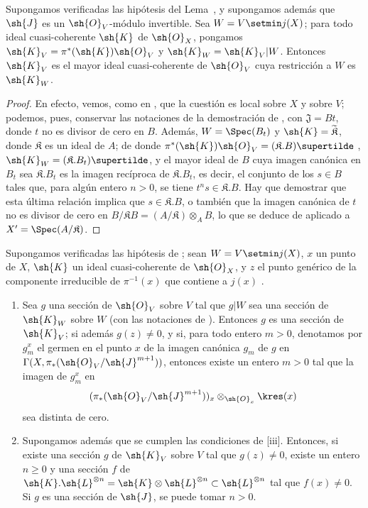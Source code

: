\documentclass[oneside,10pt]{amsart}
\renewcommand{\geq}{\geqslant}
\newcommand{\oldpage}[2][]{\marginnote{\normalfont\footnotesize\textbf{#1}~|~#2}\ignorespaces}
\let\EGAOriginalLabel\label
\renewcommand{\label}[1]{\phantomsection\EGAOriginalLabel{#1}}
\begin{document}
\begin{corollary}[8.10.4]
\label{II.8.10.4}
Supongamos verificadas las hipótesis del Lema~, y supongamos además que $\sh{J}$ es un $\sh{O}_V$-módulo invertible.
Sea $W=V\setmin j(X)$;
para todo ideal cuasi-coherente $\sh{K}$ de $\sh{O}_X$, pongamos $\sh{K}_V=\pi^*(\sh{K})\sh{O}_V$ y $\sh{K}_W=\sh{K}_V|W$.
Entonces $\sh{K}_V$ es el mayor ideal cuasi-coherente de $\sh{O}_V$ cuya restricción a $W$ es $\sh{K}_W$.
\end{corollary}

\begin{proof}
En efecto, vemos, como en , que la cuestión es local sobre $X$ y sobre $V$;
podemos, pues, conservar las notaciones de la demostración de , con $\mathfrak{J}=Bt$, donde $t$ no es divisor de cero en $B$.
Además, $W=\Spec(B_t)$ y $\sh{K}=\widetilde{\mathfrak{K}}$, donde $\mathfrak{K}$ es un ideal de $A$;
de donde $\pi^*(\sh{K})\sh{O}_V=(\mathfrak{K}.B)\supertilde$ , $\sh{K}_W=(\mathfrak{K}.B_t)\supertilde$, y el mayor ideal
\oldpage[II]{187}
de $B$ cuya imagen canónica en $B_t$ sea $\mathfrak{K}.B_t$ es la imagen recíproca de $\mathfrak{K}.B_t$, es decir, el conjunto de los $s\in B$ tales que, para algún entero $n>0$, se tiene $t^ns\in\mathfrak{K}.B$.
Hay que demostrar que esta última relación implica que $s\in\mathfrak{K}.B$, o también que la imagen canónica de $t$ no es divisor de cero en $B/\mathfrak{K}B=(A/\mathfrak{K})\otimes_A B$, lo que se deduce de  aplicado a $X'=\Spec(A/\mathfrak{K})$.
\end{proof}

\begin{corollary}[8.10.5]
\label{II.8.10.5}
Supongamos verificadas las hipótesis de ;
sean $W=V\setmin j(X)$, $x$ un punto de $X$, $\sh{K}$ un ideal cuasi-coherente de $\sh{O}_X$, y $z$ el punto genérico de la componente irreducible de $\pi^{-1}(x)$ que contiene a $j(x)$ .
\begin{enumerate}
    \item[\rm{(i)}] Sea $g$ una sección de $\sh{O}_V$ sobre $V$ tal que $g|W$ sea una sección de $\sh{K}_W$ sobre $W$ (con las notaciones de ).
        Entonces $g$ es una sección de $\sh{K}_V$;
        si además $g(z)\neq0$, y si, para todo entero $m>0$, denotamos por $g_m^x$ el germen en el punto $x$ de la imagen canónica $g_m$ de $g$ en $\Gamma(X,\pi_*(\sh{O}_V/\sh{J}^{m+1}))$, entonces existe un entero $m>0$ tal que la imagen de $g_m^x$ en
        \[
            (\pi_*(\sh{O}_V/\sh{J}^{m+1}))_x \otimes_{\sh{O}_x} \kres(x)
        \]
        sea distinta de cero.
    \item[\rm{(ii)}] Supongamos además que se cumplen las condiciones de [iii].
        Entonces, si existe una sección $g$ de $\sh{K}_V$ sobre $V$ tal que $g(z)\neq0$, existe un entero $n\geq0$ y una sección $f$ de $\sh{K}.\sh{L}^{\otimes n}=\sh{K}\otimes\sh{L}^{\otimes n}\subset\sh{L}^{\otimes n}$ tal que $f(x)\neq0$.
        Si $g$ es una sección de $\sh{J}$, se puede tomar $n>0$.
\end{enumerate}
\end{corollary}
\end{document}
